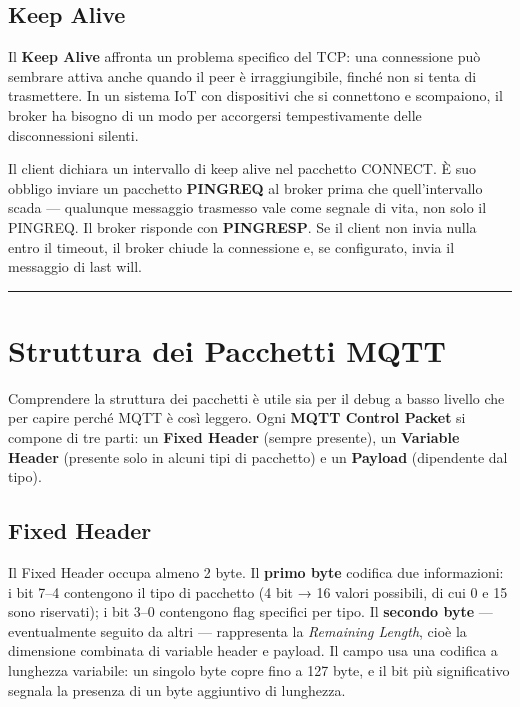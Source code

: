 \documentclass[
  italian,
  openany]{book}
\begin{document}
\subsection{Keep Alive}\label{keep-alive}

Il \textbf{Keep Alive} affronta un problema specifico del TCP: una
connessione può sembrare attiva anche quando il peer è irraggiungibile,
finché non si tenta di trasmettere. In un sistema IoT con dispositivi
che si connettono e scompaiono, il broker ha bisogno di un modo per
accorgersi tempestivamente delle disconnessioni silenti.

Il client dichiara un intervallo di keep alive nel pacchetto CONNECT. È
suo obbligo inviare un pacchetto \textbf{PINGREQ} al broker prima che
quell'intervallo scada --- qualunque messaggio trasmesso vale come
segnale di vita, non solo il PINGREQ. Il broker risponde con
\textbf{PINGRESP}. Se il client non invia nulla entro il timeout, il
broker chiude la connessione e, se configurato, invia il messaggio di
last will.

\begin{center}\rule{0.5\linewidth}{0.5pt}\end{center}

\section{Struttura dei Pacchetti
MQTT}\label{struttura-dei-pacchetti-mqtt}

Comprendere la struttura dei pacchetti è utile sia per il debug a basso
livello che per capire perché MQTT è così leggero. Ogni \textbf{MQTT
Control Packet} si compone di tre parti: un \textbf{Fixed Header}
(sempre presente), un \textbf{Variable Header} (presente solo in alcuni
tipi di pacchetto) e un \textbf{Payload} (dipendente dal tipo).

\subsection{Fixed Header}\label{fixed-header}

Il Fixed Header occupa almeno 2 byte. Il \textbf{primo byte} codifica
due informazioni: i bit 7--4 contengono il tipo di pacchetto (4 bit → 16
valori possibili, di cui 0 e 15 sono riservati); i bit 3--0 contengono
flag specifici per tipo. Il \textbf{secondo byte} --- eventualmente
seguito da altri --- rappresenta la \emph{Remaining Length}, cioè la
dimensione combinata di variable header e payload. Il campo usa una
codifica a lunghezza variabile: un singolo byte copre fino a 127 byte, e
il bit più significativo segnala la presenza di un byte aggiuntivo di
lunghezza.
\end{document}
